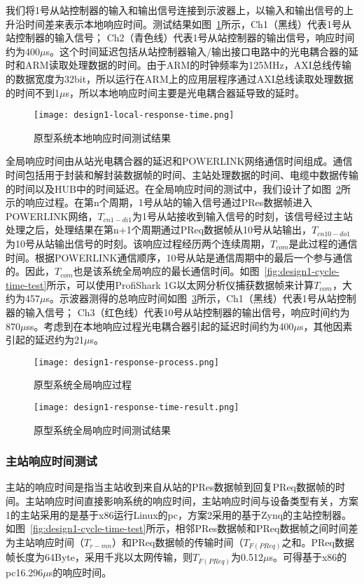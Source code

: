 我们将1号从站控制器的输入和输出信号连接到示波器上，以输入和输出信号的上升沿时间差来表示本地响应时间。测试结果如图~\ref{fig:design1-local-response-time}所示，Ch1（黑线）代表1号从站控制器的输入信号； Ch2（青色线）代表1号从站控制器的输出信号，响应时间约为400$\mu$s。这个时间延迟包括从站控制器输入/输出接口电路中的光电耦合器的延时和ARM读取处理数据的时间。由于ARM的时钟频率为125MHz，AXI总线传输的数据宽度为32bit，所以运行在ARM上的应用层程序通过AXI总线读取处理数据的时间不到1$\mu$s，所以本地响应时间主要是光电耦合器延导致的延时。

\begin{figure}[!htb]
  \centering
  \texttt{[image: design1-local-response-time.png]}
  \caption{原型系统本地响应时间测试结果}
  \label{fig:design1-local-response-time}
\end{figure}

全局响应时间由从站光电耦合器的延迟和POWERLINK网络通信时间组成。通信时间包括用于封装和解封装数据帧的时间、主站处理数据的时间、电缆中数据传输的时间以及HUB中的时间延迟。在全局响应时间的测试中，我们设计了如图~\ref{fig:design1-response-process}所示的响应过程。在第n个周期，1号从站的输入信号通过PRes数据帧进入POWERLINK网络，$T_{cn1-di1}$为1号从站接收到输入信号的时刻，该信号经过主站处理之后，处理结果在第n+1个周期通过PReq数据帧从10号从站输出，$T_{cn10-do1}$为10号从站输出信号的时刻。该响应过程经历两个连续周期，$T_{com}$是此过程的通信时间。根据POWERLINK通信顺序，10号从站是通信周期中的最后一个参与通信的。因此，$T_{com}$也是该系统全局响应的最长通信时间。如图~\ref{fig:design1-cycle-time-test}所示，可以使用ProfiShark 1G以太网分析仪捕获数据帧来计算$T_{com}$，大约为457$\mu$s。示波器测得的总响应时间如图~\ref{fig:design1-response-time-result}所示，Ch1（黑线）代表1号从站控制器的输入信号； Ch3（红色线）代表10号从站控制器的输出信号，响应时间约为870$\mu$ss。考虑到在本地响应过程光电耦合器引起的延迟时间约为400$\mu$s，其他因素引起的延迟约为21$\mu$s。

\begin{figure}[!htb]
  \centering
  \texttt{[image: design1-response-process.png]}
  \caption{原型系统全局响应过程}
  \label{fig:design1-response-process}
\end{figure}

\begin{figure}[!htb]
  \centering
  \texttt{[image: design1-response-time-result.png]}
  \caption{原型系统全局响应时间测试结果}
  \label{fig:design1-response-time-result}
\end{figure}

\subsubsection{主站响应时间测试}
主站的响应时间是指当主站收到来自从站的PRes数据帧到回复PReq数据帧的时间。主站响应时间直接影响系统的响应时间，主站响应时间与设备类型有关，方案1的主站采用的是基于x86运行Linux的pc，方案2采用的基于Zynq的主站控制器。如图~\ref{fig:design1-cycle-time-test}所示，相邻PRes数据帧和PReq数据帧之间时间差为主站响应时间（$T_{r-mn}$）和PReq数据帧的传输时间（$T_{F(PReq)}$之和。PReq数据帧长度为64Byte，采用千兆以太网传输，则$T_{F(PReq)}$为0.512$\mu$s。可得基于x86的pc16.296$\mu$s的响应时间。

